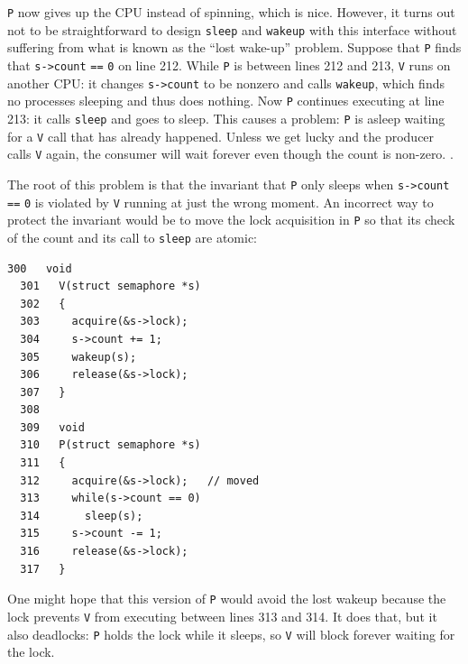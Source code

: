 
\lstinline{P}
now gives up the CPU instead of spinning, which is nice.
However, it turns out not to be straightforward to design
\lstinline{sleep}
and 
\lstinline{wakeup}
with this interface without suffering
from what is known as the ``lost wake-up'' problem.
Suppose that
\lstinline{P}
finds that
\lstinline{s->count}
\lstinline{==}
\lstinline{0} 
on line 212.
While
\lstinline{P}
is between lines 212 and 213,
\lstinline{V}
runs on another CPU:
it changes
\lstinline{s->count}
to be nonzero and calls
\lstinline{wakeup},
which finds no processes sleeping and thus does nothing.
Now
\lstinline{P}
continues executing at line 213:
it calls
\lstinline{sleep}
and goes to sleep.
This causes a problem:
\lstinline{P}
is asleep waiting for a \lstinline{V} call
that has already happened.
Unless we get lucky and the producer calls
\lstinline{V} again, the consumer will wait
forever even though the count is non-zero.
.

The root of this problem is that the
invariant that
\lstinline{P}
only sleeps when
\lstinline{s->count}
\lstinline{==}
\lstinline{0}
is violated by 
\lstinline{V}
running at just the wrong moment.
An incorrect way to protect the invariant would be to 
move the lock acquisition in
\lstinline{P}
so that its check of the count and its call to \lstinline{sleep}
are atomic:
\begin{lstlisting}[]
  300   void
  301   V(struct semaphore *s)
  302   {
  303     acquire(&s->lock);
  304     s->count += 1;
  305     wakeup(s);
  306     release(&s->lock);
  307   }
  308   
  309   void
  310   P(struct semaphore *s)
  311   {
  312     acquire(&s->lock);   // moved
  313     while(s->count == 0)
  314       sleep(s);
  315     s->count -= 1;
  316     release(&s->lock);
  317   }
\end{lstlisting}
One might hope that this version of
\lstinline{P}
would avoid the lost wakeup because the lock prevents
\lstinline{V}
from executing between lines 313 and 314.
It does that, but it also deadlocks:
\lstinline{P}
holds the lock while it sleeps,
so \lstinline{V} will block forever waiting for the lock.

